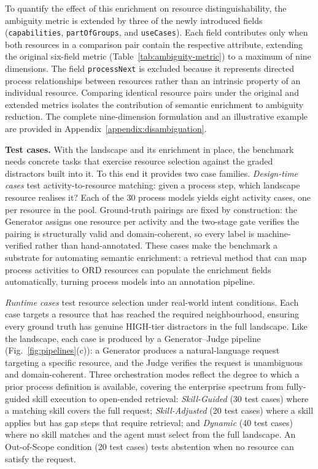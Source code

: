 \documentclass[10pt,twocolumn]{article}
\begin{document}
To quantify the effect of this enrichment on resource distinguishability, the ambiguity metric is extended by three of the newly introduced fields (\texttt{capabilities}, \texttt{partOfGroups}, and \texttt{useCases}). Each field contributes only when both resources in a comparison pair contain the respective attribute, extending the original six-field metric (Table~\ref{tab:ambiguity-metric}) to a maximum of nine dimensions. The field \texttt{processNext} is excluded because it represents directed process relationships between resources rather than an intrinsic property of an individual resource. Comparing identical resource pairs under the original and extended metrics isolates the contribution of semantic enrichment to ambiguity reduction. The complete nine-dimension formulation and an illustrative example are provided in Appendix~\ref{appendix:disambiguation}.

\textbf{Test cases.} With the landscape and its enrichment in place, the benchmark needs concrete tasks that exercise resource selection against the graded distractors built into it. To this end it provides two case families. \emph{Design-time cases} test activity-to-resource matching: given a process step, which landscape resource realises it? Each of the 30 process models yields eight activity cases, one per resource in the pool. Ground-truth pairings are fixed by construction: the Generator assigns one resource per activity and the two-stage gate verifies the pairing is structurally valid and domain-coherent, so every label is machine-verified rather than hand-annotated. These cases make the benchmark a substrate for automating semantic enrichment: a retrieval method that can map process activities to ORD resources can populate the enrichment fields automatically, turning process models into an annotation pipeline.

\emph{Runtime cases} test resource selection under real-world intent conditions. Each case targets a resource that has reached the required neighbourhood, ensuring every ground truth has genuine HIGH-tier distractors in the full landscape. Like the landscape, each case is produced by a Generator–Judge pipeline (Fig.~\ref{fig:pipelines}(c)): a Generator produces a natural-language request targeting a specific resource, and the Judge verifies the request is unambiguous and domain-coherent. Three orchestration modes reflect the degree to which a prior process definition is available, covering the enterprise spectrum from fully-guided skill execution to open-ended retrieval: \emph{Skill-Guided} (30 test cases) where a matching skill covers the full request; \emph{Skill-Adjusted} (20 test cases) where a skill applies but has gap steps that require retrieval; and \emph{Dynamic} (40 test cases) where no skill matches and the agent must select from the full landscape. An Out-of-Scope condition (20 test cases) tests abstention when no resource can satisfy the request. 
\end{document}
